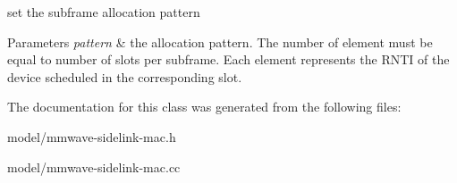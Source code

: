 set the subframe allocation pattern 


\begin{DoxyParams}{Parameters}
{\em pattern} & the allocation pattern. The number of element must be equal to number of slots per subframe. Each element represents the R\+N\+TI of the device scheduled in the corresponding slot. \\
\hline
\end{DoxyParams}


The documentation for this class was generated from the following files\+:\begin{DoxyCompactItemize}
\item 
model/mmwave-\/sidelink-\/mac.\+h\item 
model/mmwave-\/sidelink-\/mac.\+cc\end{DoxyCompactItemize}
